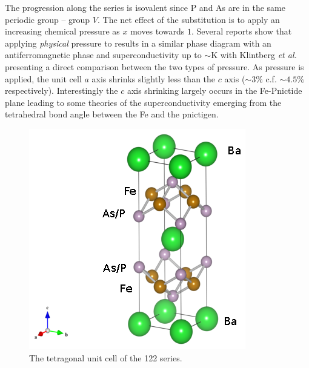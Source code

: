  The progression along the series is isovalent since P and As are in the same periodic group -- group $V$. The net effect of the substitution is to apply an increasing chemical pressure as $x$ moves towards $1$. Several reports show that applying \textit{physical} pressure to \BaFeAs results in a similar phase diagram with an antiferromagnetic phase and superconductivity up to $\sim$\unit[30]{K}\cite{Yamazaki2010,Colombier2009,Alireza2009} with Klintberg \textit{et al.}\cite{Klintberg2010} presenting a direct comparison between the two types of pressure. As pressure is applied, the unit cell $a$ axis shrinks slightly less than the $c$ axis ($\sim3\%$ c.f. $\sim4.5\%$ respectively). Interestingly the $c$ axis shrinking largely occurs in the Fe-Pnictide plane leading to some theories of the superconductivity emerging from the tetrahedral bond angle between the Fe and the pnictigen. %
\begin{figure}
    \begin{center}
        \includegraphics[scale=1.0]{Chapter3-dHvABaFe2P2/Figures/BaFe2P2Series/UnitCell/UnitCell}
        \caption{The tetragonal unit cell of the 122 \BaFePAs series.}
        \label{Fig:3:UnitCell}
    \end{center}
\end{figure}


